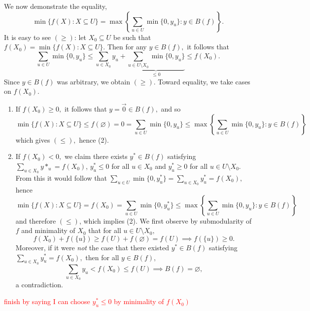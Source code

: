 \documentclass{article}
\let\emptyset\varnothing
\begin{document}



  We now demonstrate the equality,
  \begin{equation}
      \min\{f(X):X\subseteq U\} = \max\left\{\sum_{u\in U} \min\{0, y_u\}: y\in B(f) \right\}.
  \end{equation}
  It is easy to see $(\geq)$: let $X_0\subseteq U$ be such that $f(X_0)=\min\{f(X):X\subseteq U\}.$ Then for any $y\in B(f),$ it follows that $$\sum_{u\in U}\min\{0,y_u\}\leq \sum_{u\in X_0}y_u+\underbrace{\sum_{u\in U\setminus X_0}\min\{0,y_u\}}_{\leq 0}\leq f(X_0).$$Since $y\in B(f)$ was arbitrary, we obtain $(\geq)$. Toward equality, we take cases on $f(X_0).$

  \begin{enumerate}[label=Case \arabic*:]
    \item If $f(X_0)\geq 0,$ it follows that $y=\vec{0}\in B(f),$ and so $$\min\{f(X):X\subseteq U\}\leq f(\emptyset)=0=\sum_{u\in U}\min\{0,y_u\}\leq \max\left\{\sum_{u\in U} \min\{0, y_u\}: y\in B(f) \right\}$$which gives $(\leq),$ hence (2).
    \item If $f(X_0)<0,$ we claim there exists $y^*\in B(f)$ satisfying $\sum_{u\in X_0} y*_u=f(X_0)$, $y^*_u\leq 0$ for all $u\in X_0$ and $y^*_u\geq 0$ for all $u\in U\setminus X_0.$ From this it would follow that $\sum_{u\in U}\min\{0,y^*_u\}=\sum_{u\in X_0} y^*_u=f(X_0),$ hence $$\min\{f(X):X\subseteq U\} =f(X_0)= \sum_{u\in U}\min\{0,y^*_u\}\leq\max\left\{\sum_{u\in U} \min\{0, y_u\}: y\in B(f) \right\}$$and therefore $(\leq)$, which implies (2). We first observe by submodularity of $f$ and minimality of $X_0$ that for all $u\in U\setminus X_0,$
    $$f(X_0)+f(\{u\})\geq f(U)+f(\emptyset)=f(U)\implies f(\{u\})\geq 0.$$Moreover, if it were \textit{not} the case that there existed $y^*\in B(f)$ satisfying $\sum_{u\in X_0}y^*_u=f(X_0),$ then for all $y\in B(f)$, $$\sum_{u\in X_0}y_u<f(X_0)\leq f(U)\implies B(f)=\emptyset,$$a contradiction.
  \end{enumerate}

  \textcolor{red}{finish by saying I can choose $y^*_u\leq 0$ by minimality of $f(X_0)$}
\end{document}
